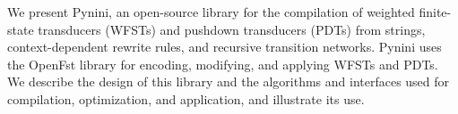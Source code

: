 We present Pynini, an open-source library for the compilation of weighted finite-state transducers (WFSTs) and pushdown transducers (PDTs) from strings, context-dependent rewrite rules, and recursive transition networks. Pynini uses the OpenFst library for encoding, modifying, and applying WFSTs and PDTs. We describe the design of this library and the algorithms and interfaces used for compilation, optimization, and application, and illustrate its use.
